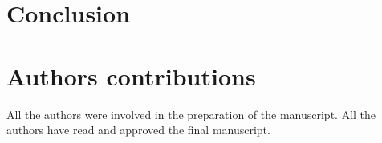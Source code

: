 \section{Conclusion}

\section{Authors contributions}
All the authors were involved in the preparation of the manuscript.
All the authors have read and approved the final manuscript.









